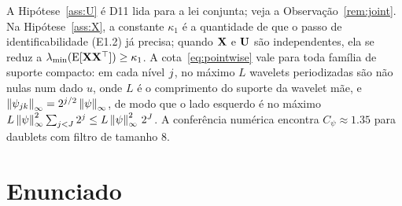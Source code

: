 \documentclass[11pt]{article}
\newcommand{\lmin}{\lambda_{\min}}
\begin{document}
A Hipótese~\ref{ass:U} é D11 lida para a lei conjunta; veja a Observação~\ref{rem:joint}. Na
Hipótese~\ref{ass:X}, a constante $\kappa_1$ é a quantidade de que o passo de identificabilidade
(E1.2) já precisa; quando $\mathbf{X}$ e $\mathbf{U}$ são independentes, ela se reduz a $\lmin(\E[\bX\bX\T]) \ge \kappa_1$.
A cota~\eqref{eq:pointwise} vale para toda família de suporte compacto: em cada nível $j$, no máximo
$L$ wavelets periodizadas são não nulas num dado $u$, onde $L$ é o comprimento do suporte da wavelet
mãe, e $\left\lVert \psi_{jk} \right\rVert_\infty = 2^{j/2}\left\lVert \psi \right\rVert_\infty$, de modo que o lado esquerdo é no máximo
$L\left\lVert \psi \right\rVert_\infty^2 \sum_{j < J} 2^{j} \le L\left\lVert \psi \right\rVert_\infty^2\, 2^{J}$. A conferência numérica encontra
$C_\psi \approx 1.35$ para daublets com filtro de tamanho 8.

\section*{Enunciado}
\end{document}

